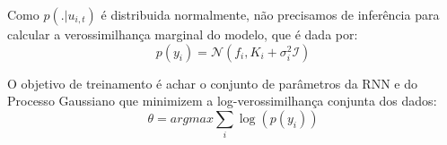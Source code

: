 Como $p(. | u_{i,t})$ é distribuida normalmente, não precisamos de inferência para calcular a verossimilhança marginal do modelo, que é dada por: \\

\[
p(y_{i}) = \mathcal{N}(f_i,K_i + \sigma_i^2\mathcal{I})
\]

O objetivo de treinamento é achar o conjunto de parâmetros da RNN e do Processo Gaussiano que minimizem a log-verossimilhança conjunta dos dados: \\

\[
\theta = argmax \sum_i{\log(p(y_i))}
\]


